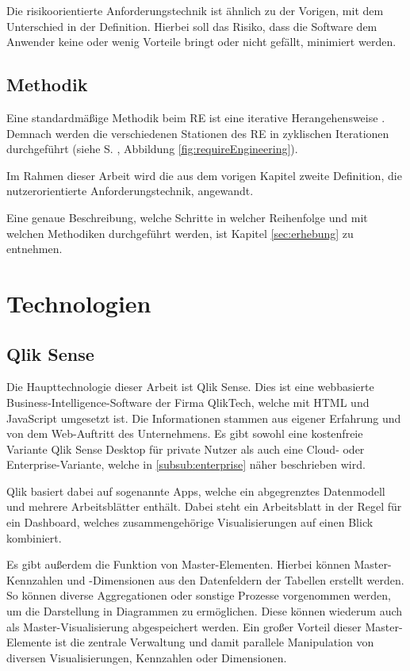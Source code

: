 Die risikoorientierte Anforderungstechnik ist ähnlich zu der Vorigen, mit dem Unterschied in der Definition.
Hierbei soll das Risiko, dass die Software dem Anwender keine oder wenig Vorteile bringt oder nicht gefällt, minimiert werden.

\subsection{Methodik}
\label{sub:methodik}
Eine standardmäßige Methodik beim \gls{RE} ist eine iterative Herangehensweise \cite{Pohl.2011}.
Demnach werden die verschiedenen Stationen des \gls{RE} in zyklischen Iterationen durchgeführt (siehe S. \pageref{fig:requireEngineering}, Abbildung \ref{fig:requireEngineering}).

Im Rahmen dieser Arbeit wird die aus dem vorigen Kapitel zweite Definition, die nutzerorientierte Anforderungstechnik, angewandt. 

Eine genaue Beschreibung, welche Schritte in welcher Reihenfolge und mit welchen Methodiken durchgeführt werden, ist Kapitel \ref{sec:erhebung} zu entnehmen.
 
 
\section{Technologien}
\subsection{Qlik Sense}
\label{sub:qlik}
Die Haupttechnologie dieser Arbeit ist Qlik Sense.
Dies ist eine webbasierte Business-Intelligence-Software der Firma QlikTech, welche mit HTML und JavaScript umgesetzt ist.
Die Informationen stammen aus eigener Erfahrung und von dem Web-Auftritt \cite{QlikTech.2019} des Unternehmens. 
Es gibt sowohl eine kostenfreie Variante Qlik Sense Desktop für private Nutzer als auch eine Cloud- oder Enterprise-Variante, welche in \ref{subsub:enterprise} näher beschrieben wird.

Qlik basiert dabei auf sogenannte \glqq Apps\grqq{}, welche ein abgegrenztes Datenmodell und mehrere Arbeitsblätter enthält.
Dabei steht ein Arbeitsblatt in der Regel für ein \gls{Dashboard}, welches zusammengehörige Visualisierungen auf einen Blick kombiniert.


Es gibt außerdem die Funktion von Master-Elementen.
Hierbei können Master-Kennzahlen und -Dimensionen aus den Datenfeldern der Tabellen erstellt werden. 
So können diverse Aggregationen oder sonstige Prozesse vorgenommen werden, um die Darstellung in Diagrammen zu ermöglichen.
Diese können wiederum auch als Master-Visualisierung abgespeichert werden.
Ein großer Vorteil dieser Master-Elemente ist die zentrale Verwaltung und damit parallele Manipulation von diversen Visualisierungen, Kennzahlen oder Dimensionen.

